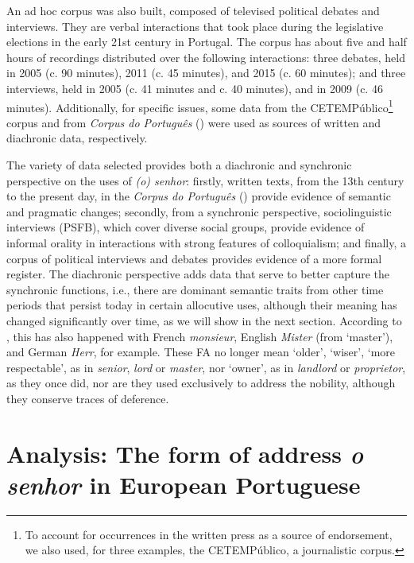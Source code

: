 \documentclass[output=paper]{langscibook}
\begin{document}
An ad hoc corpus was also built, composed of televised political debates and interviews. They are verbal interactions that took place during the legislative elections in the early 21st century in Portugal. The corpus has about five and half hours of recordings distributed over the following interactions: three debates, held in 2005 (c. 90 minutes), 2011 (c. 45 minutes), and 2015 (c. 60 minutes); and three interviews, held in 2005 (c. 41 minutes and c. 40 minutes), and in 2009 (c. 46 minutes). Additionally, for specific issues, some data from the CETEMPúblico\footnote{To account for occurrences in the written press as a source of endorsement, we also used, for three examples, the CETEMPúblico, a journalistic corpus.} corpus and from \textit{Corpus do Português} (\citealt{DaviesFerreira2016}) were used as sources of written and diachronic data, respectively. 



The variety of data selected provides both a diachronic and synchronic perspective on the uses of \textit{(o) senhor}: firstly, written texts, from the 13th century to the present day, in the \textit{Corpus do Português} (\citealt{DaviesFerreira2016}) provide evidence of semantic and pragmatic changes; secondly, from a synchronic perspective, sociolinguistic interviews (PSFB), which cover diverse social groups, provide evidence of informal orality in interactions with strong features of colloquialism; and finally, a corpus of political interviews and debates provides evidence of a more formal register. The diachronic perspective adds data that serve to better capture the synchronic functions, i.e., there are dominant semantic traits from other time periods that persist today in certain allocutive uses, although their meaning has changed significantly over time, as we will show in the next section. According to \citet[257]{Dickey1997}, this has also happened with French \textit{monsieur}, English \textit{Mister} (from ‘master’), and German \textit{Herr}, for example. These FA no longer mean ‘older’, ‘wiser’, ‘more respectable’, as in \textit{senior}, \textit{lord} or \textit{master}, nor ‘owner’, as in \textit{landlord} or \textit{proprietor}, as they once did, nor are they used exclusively to address the nobility, although they conserve traces of deference.


\section{Analysis: The form of address \textit{o senhor} in European Portuguese}\label{sec:marques:4}
\end{document}
